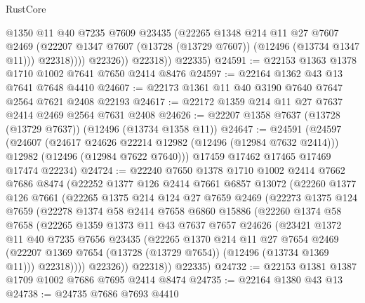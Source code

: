 \begin{lexlean}{RustCore}
\begin{coremodule}
                    @1350
                    @11
                    @40
                    @7235
                    @7609
                    @23435
                    (@22265
                      @1348
                      @214
                      @11
                      @27
                      @7607
                      @2469
                      (@22207 @1347 @7607 (@13728 (@13729 @7607)) (@12496 (@13734 @1347 @11)))
                      @22318))))
              @22326))
          @22318))
      @22335)
@24591 := @22153 @1363 @1378 @1710 @1002 @7641 @7650 @2414 @8476
@24597 := @22164 @1362 @43 @13 @7641 @7648 @4410
@24607 := @22173 @1361 @11 @40 @3190 @7640 @7647 @2564 @7621 @2408 @22193
@24617 := @22172 @1359 @214 @11 @27 @7637 @2414 @2469 @2564 @7631 @2408
@24626 := @22207 @1358 @7637 (@13728 (@13729 @7637)) (@12496 (@13734 @1358 @11))
@24647 := @24591
    (@24597
      (@24607
        (@24617 @24626 @22214 @12982 (@12496 (@12984 @7632 @2414)))
        @12982
        (@12496 (@12984 @7622 @7640)))
      @17459
      @17462
      @17465
      @17469
      @17474
      @22234)
@24724 := @22240
    @7650
    @1378
    @1710
    @1002
    @2414
    @7662
    @7686
    @8474
    (@22252
      @1377
      @126
      @2414
      @7661
      @6857
      @13072
      (@22260
        @1377
        @126
        @7661
        (@22265
          @1375
          @214
          @124
          @27
          @7659
          @2469
          (@22273
            @1375
            @124
            @7659
            (@22278
              @1374
              @58
              @2414
              @7658
              @6860
              @15886
              (@22260
                @1374
                @58
                @7658
                (@22265
                  @1359
                  @1373
                  @11
                  @43
                  @7637
                  @7657
                  @24626
                  (@23421
                    @1372
                    @11
                    @40
                    @7235
                    @7656
                    @23435
                    (@22265
                      @1370
                      @214
                      @11
                      @27
                      @7654
                      @2469
                      (@22207 @1369 @7654 (@13728 (@13729 @7654)) (@12496 (@13734 @1369 @11)))
                      @22318))))
              @22326))
          @22318))
      @22335)
@24732 := @22153 @1381 @1387 @1709 @1002 @7686 @7695 @2414 @8474
@24735 := @22164 @1380 @43 @13
@24738 := @24735 @7686 @7693 @4410

\end{coremodule}
\end{lexlean}
